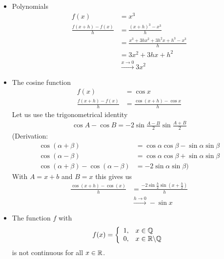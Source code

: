 \begin{ex} \mbox \\
\begin{itemize}
\item  Polynomials
\begin{align*}
f(x) & = x^3 \\
\frac{f(x+h) -f(x)}{h} & = \frac{(x+h)^3-x^3}{h} \\
 & = \frac{x^3+3hx^2+3h^2x+h^3-x^3}{h} \\
& = 3x^2 + 3hx +h^2 \\
& \overset{x \to 0}{\to} 3x^2
\end{align*}
\item The cosine function
\begin{align*}
f(x) & = \cos x  \\
\frac{f(x+h) -f(x)}{h} & = \frac{\cos(x+h) - \cos x }{h} 
\end{align*}
Let us use the trigonometrical identity
\begin{align*}
\cos A - \cos B = -2 \sin \frac{A-B} 2 \sin \frac{A+B} 2
\end{align*}
(Derivation:
\begin{align*}
\cos(\alpha+\beta ) & = \cos \alpha \cos \beta - \sin \alpha \sin \beta \\
\cos(\alpha - \beta) & = \cos \alpha \cos \beta + \sin \alpha \sin \beta \\
\cos(\alpha+\beta ) - \cos(\alpha - \beta) & = -2\sin \alpha \sin \beta)
\end{align*}
With $A= x+b$ and $B=x$ this gives us
\begin{align*}
\frac{\cos(x+h) -\cos(x)}{h} & = \frac{-2 \sin \frac h 2 \sin \left( x + \frac h 2 \right)}{h} \\
& \overset{h \to 0}{\to} -\sin x
\end{align*}
\item
The function $f$ with 
\begin{align*}
f(x) = \left\{ 
\begin{array}{ll}
1, & x \in \mathbb Q \\
0, & x \in \mathbb R \backslash \mathbb Q
\end{array} \right.
\end{align*}
is not continuous for all $x \in \mathbb R$.
\end{itemize}
\end{ex}



